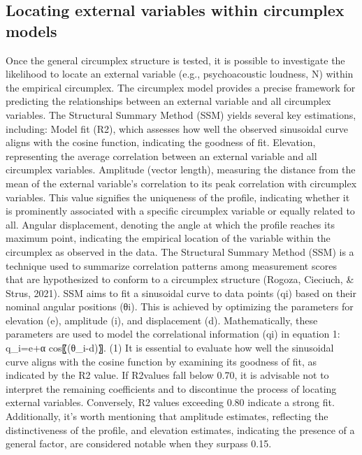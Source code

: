 \documentclass[
  authoryear,
  preprint,
  3p]{elsarticle}
\begin{document}
\subsection{Locating external variables within circumplex
models}\label{locating-external-variables-within-circumplex-models}

Once the general circumplex structure is tested, it is possible to
investigate the likelihood to locate an external variable (e.g.,
psychoacoustic loudness, N) within the empirical circumplex. The
circumplex model provides a precise framework for predicting the
relationships between an external variable and all circumplex variables.
The Structural Summary Method (SSM) yields several key estimations,
including: Model fit (R2), which assesses how well the observed
sinusoidal curve aligns with the cosine function, indicating the
goodness of fit. Elevation, representing the average correlation between
an external variable and all circumplex variables. Amplitude (vector
length), measuring the distance from the mean of the external variable's
correlation to its peak correlation with circumplex variables. This
value signifies the uniqueness of the profile, indicating whether it is
prominently associated with a specific circumplex variable or equally
related to all. Angular displacement, denoting the angle at which the
profile reaches its maximum point, indicating the empirical location of
the variable within the circumplex as observed in the data. The
Structural Summary Method (SSM) is a technique used to summarize
correlation patterns among measurement scores that are hypothesized to
conform to a circumplex structure (Rogoza, Cieciuch, \& Strus, 2021).
SSM aims to fit a sinusoidal curve to data points (qi) based on their
nominal angular positions (θi). This is achieved by optimizing the
parameters for elevation (e), amplitude (i), and displacement (d).
Mathematically, these parameters are used to model the correlational
information (qi) in equation 1: q\_i=e+α cos⁡〖(θ\_i-d)〗. (1) It is
essential to evaluate how well the sinusoidal curve aligns with the
cosine function by examining its goodness of fit, as indicated by the R2
value. If R2values fall below 0.70, it is advisable not to interpret the
remaining coefficients and to discontinue the process of locating
external variables. Conversely, R2 values exceeding 0.80 indicate a
strong fit. Additionally, it's worth mentioning that amplitude
estimates, reflecting the distinctiveness of the profile, and elevation
estimates, indicating the presence of a general factor, are considered
notable when they surpass 0.15.
\end{document}
